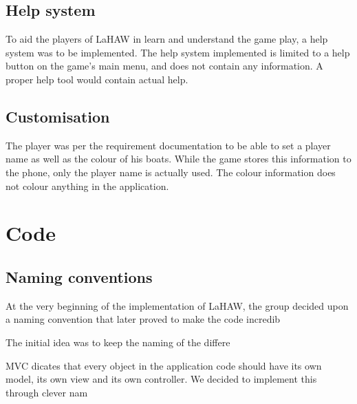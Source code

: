 \subsection{Help system}
To aid the players of LaHAW in learn and understand the game play, a help system was to be implemented. The help system implemented is limited to a help button on the game's main menu, and does not contain any information. A proper help tool would contain actual help.

\subsection{Customisation}
The player was per the requirement documentation to be able to set a player name as well as the colour of his boats. While the game stores this information to the phone, only the player name is actually used. The colour information does not colour anything in the application.



\section{Code}

\subsection{Naming conventions}
At the very beginning of the implementation of LaHAW, the group decided upon a naming convention that later proved to make the code incredib


The initial idea was to keep the naming of the differe


MVC dicates that every object in the application code should have its own model, its own view and its own controller. We decided to implement this through clever nam